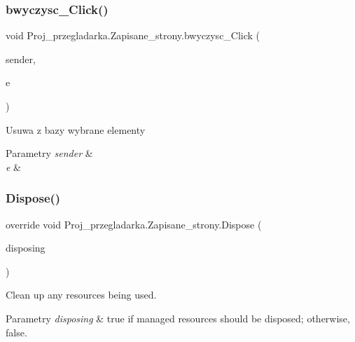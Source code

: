 \subsubsection{\texorpdfstring{bwyczysc\_Click()}{bwyczysc\_Click()}}
{\footnotesize\ttfamily void Proj\+\_\+przegladarka.\+Zapisane\+\_\+strony.\+bwyczysc\+\_\+\+Click (\begin{DoxyParamCaption}\item[{object}]{sender,  }\item[{Event\+Args}]{e }\end{DoxyParamCaption})\hspace{0.3cm}{\ttfamily [private]}}



Usuwa z bazy wybrane elementy 


\begin{DoxyParams}{Parametry}
{\em sender} & \\
\hline
{\em e} & \\
\hline
\end{DoxyParams}
\mbox{\label{class_proj__przegladarka_1_1_zapisane__strony_afef5ceee204e7eeafed0f3a4c4a06cbd}} 
\subsubsection{\texorpdfstring{Dispose()}{Dispose()}}
{\footnotesize\ttfamily override void Proj\+\_\+przegladarka.\+Zapisane\+\_\+strony.\+Dispose (\begin{DoxyParamCaption}\item[{bool}]{disposing }\end{DoxyParamCaption})\hspace{0.3cm}{\ttfamily [protected]}}



Clean up any resources being used. 


\begin{DoxyParams}{Parametry}
{\em disposing} & true if managed resources should be disposed; otherwise, false.\\
\hline
\end{DoxyParams}
\mbox{\label{class_proj__przegladarka_1_1_zapisane__strony_aabe9e54fa0cd5c16ae40aee989989c44}} 
